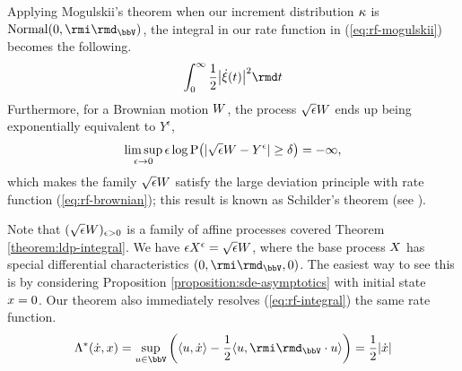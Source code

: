 \begin{example}
  \label{example:brownian}
  Applying Mogulskii's theorem when our increment distribution $\kappa$ is $\operatorname{Normal}(0,\id_\vecSpace)$, the integral in our rate function in (\ref{eq:rf-mogulskii}) becomes the following.
  \begin{equation}
    \label{eq:rf-brownian}
    \int_0^\infty \frac12\big|\dot\pathVar(t)\big|^2 \rmd t
  \end{equation}
  Furthermore, for a Brownian motion $W$, the process $\sqrt\epsilon W$ ends up being exponentially equivalent to $Y^\epsilon$,
  \begin{equation*}
    \limsup_{\epsilon\rightarrow0} \epsilon\log {\operatorname{P}}\big( |\sqrt\epsilon W - Y^\epsilon| \geq \delta \big) = -\infty,
  \end{equation*}
  which makes the family $\sqrt\epsilon W$ satisfy the large deviation principle with rate function (\ref{eq:rf-brownian}); this result is known as Schilder's theorem (see \cite[Theorem 5.2.3]{dembo2010}).

  Note that $(\sqrt\epsilon W)_{\epsilon>0}$ is a family of affine processes covered Theorem \ref{theorem:ldp-integral}.
  We have $\epsilon X^\epsilon = \sqrt\epsilon W$, where the base process $X$ has special differential characteristics $(0, \id_\vecSpace, 0)$.
  The easiest way to see this is by considering Proposition \ref{proposition:sde-asymptotics} with initial state $x = 0$.
  Our theorem also immediately resolves (\ref{eq:rf-integral}) the same rate function.
  \begin{equation*}
    \ode^*(\diffVar, \stateVar)
    = \sup_{\momentVar \in \vecSpace} \bigg( \prj{\momentVar}{\diffVar} - \frac12\prj{\momentVar}{\id_\vecSpace\cdot \momentVar} \bigg) = \frac12 |\diffVar|
  \end{equation*}
\end{example}
